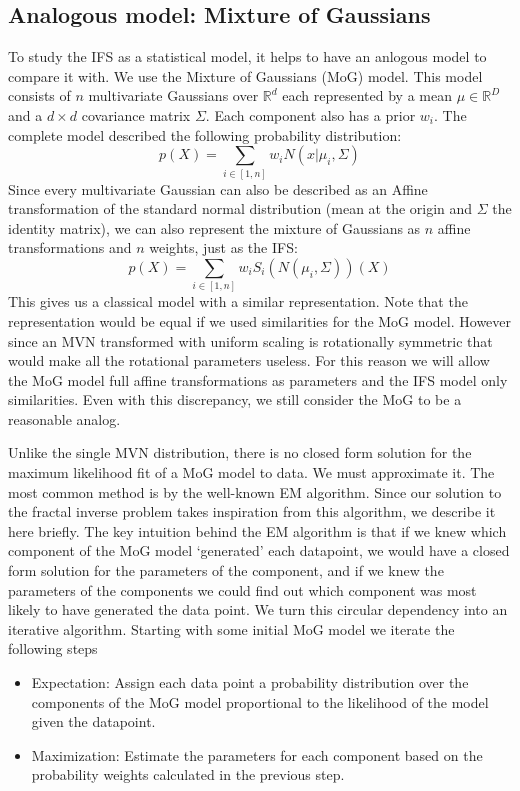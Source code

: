 \documentclass[11pt]{article}
\theoremstyle{definition}
\begin{document}
\subsection{Analogous model: Mixture of Gaussians}

To study the IFS as a statistical model, it helps to have an anlogous model to compare it with. We use the Mixture of Gaussians (MoG) model. This model consists of $n$ multivariate Gaussians over ${\mathbb R}^d$ each represented by a mean $\mu \in {\mathbb R}^D$ and a $d \times d$ covariance matrix $\Sigma$. Each component also has a prior $w_i$. The complete model described the following probability distribution:
\[
p(X) = \sum_{i \in [1,n]} w_i N(x|\mu_i, \Sigma)
\]
Since every multivariate Gaussian can also be described as an Affine transformation of the standard normal distribution (mean at the origin and $\Sigma$ the identity matrix), we can also represent the mixture of Gaussians as $n$ affine transformations and $n$ weights, just as the IFS:
\[
p(X) = \sum_{i \in [1,n]} w_i S_i(N(\mu_i, \Sigma))(X)
\]
This gives us a classical model with a similar representation. Note that the representation would be equal if we used similarities for the MoG model. However since an MVN transformed with uniform scaling is rotationally symmetric that would make all the rotational parameters useless. For this reason we will allow the MoG model full affine transformations as parameters and the IFS model only similarities. Even with this discrepancy, we still consider the MoG to be a reasonable analog.

Unlike the single MVN distribution, there is no closed form solution for the maximum likelihood fit of a MoG model to data. We must approximate it. The most common method is by the well-known EM algorithm. Since our solution to the fractal inverse problem takes inspiration from this algorithm, we describe it here briefly. The key intuition behind the EM algorithm is that if we knew which component of the MoG model `generated' each datapoint, we would have a closed form solution for the parameters of the component, and if we knew the parameters of the components we could find out which component was most likely to have generated the data point. We turn this circular dependency into an iterative algorithm. Starting with some initial MoG model we iterate the following steps

\begin{itemize}
  \item Expectation: Assign each data point a probability distribution over the components of the MoG model proportional to the likelihood of the model given the datapoint.
  \item Maximization: Estimate the parameters for each component based on the probability weights calculated in the previous step.  
\end{itemize} 
\end{document}
